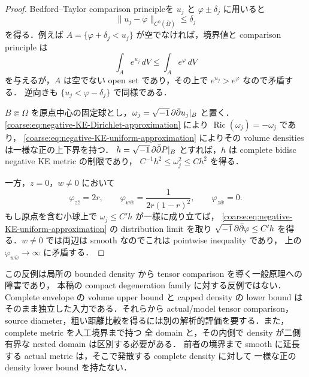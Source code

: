 \documentclass[a4paper,11pt]{ltjsarticle}
\numberwithin{equation}{section}
\theoremstyle{plain}
\theoremstyle{definition}
\theoremstyle{remark}
\newcommand{\Ric}{\operatorname{Ric}}\newcommand{\tr}{\operatorname{tr}}\newcommand{\osc}{\operatorname{osc}}\newcommand{\vol}{\operatorname{Vol}}
\begin{document}
\begin{proof}
Bedford--Taylor comparison principle\cite[Theorem~4.1]{BedfordTaylorCapacity}を
$u_j$ と $\varphi\pm\delta_j$ に用いると
\begin{equation}\label{coarse:eq:negative-KE-uniform-approximation}
 \|u_j-\varphi\|_{C^0(\overline\Omega)}\le\delta_j
\end{equation}
を得る．例えば $A=\{\varphi+\delta_j<u_j\}$ が空でなければ，境界値と comparison principle は
\[
 \int_A e^{u_j}\,dV\le\int_A e^\varphi\,dV
\]
を与えるが，$A$ は空でない open set であり，その上で $e^{u_j}>e^\varphi$ なので矛盾する．
逆向きも $\{u_j<\varphi-\delta_j\}$ で同様である．

$B\Subset\Omega$ を原点中心の固定球とし，$\omega_j=\sqrt{-1}\,\partial\bar\partial u_j|_B$ と置く．
\eqref{coarse:eq:negative-KE-Dirichlet-approximation} により $\Ric(\omega_j)=-\omega_j$ であり，
\eqref{coarse:eq:negative-KE-uniform-approximation} によりその volume densities は一様な正の上下界を持つ．
$h=\sqrt{-1}\,\partial\bar\partial P|_B$ とすれば，$h$ は complete bidisc negative KE metric の制限であり，
$C^{-1}h^2\le\omega_j^2\le Ch^2$ を得る．

一方，$z=0$，$w\ne0$ において
\[
 \varphi_{z\bar z}=2r,
 \qquad \varphi_{w\bar w}=\frac{1}{2r(1-r)^2},
 \qquad \varphi_{z\bar w}=0.
\]
もし原点を含む小球上で $\omega_j\le C'h$ が一様に成り立てば，
\eqref{coarse:eq:negative-KE-uniform-approximation} の distribution limit を取り
$\sqrt{-1}\,\partial\bar\partial\varphi\le C'h$ を得る．$w\ne0$ では両辺は smooth なのでこれは pointwise inequality であり，
上の $\varphi_{w\bar w}\to\infty$ に矛盾する．
\end{proof}

\begin{remark}\label{coarse:rem:density-comparison-status}
この反例は局所の bounded density から tensor comparison を導く一般原理への障害であり，
本稿の compact degeneration family に対する反例ではない．Complete envelope の volume upper bound と
capped density の lower bound はそのまま独立した入力である．それらから actual/model tensor comparison，
source diameter，粗い距離比較を得るには別の解析的評価を要する．また，complete metric を人工境界まで持つ
全 domain と，その内側で density が二側有界な nested domain は区別する必要がある．
前者の境界まで smooth に延長する actual metric は，そこで発散する complete density に対して
一様な正の density lower bound を持たない．
\end{remark}
\end{document}
